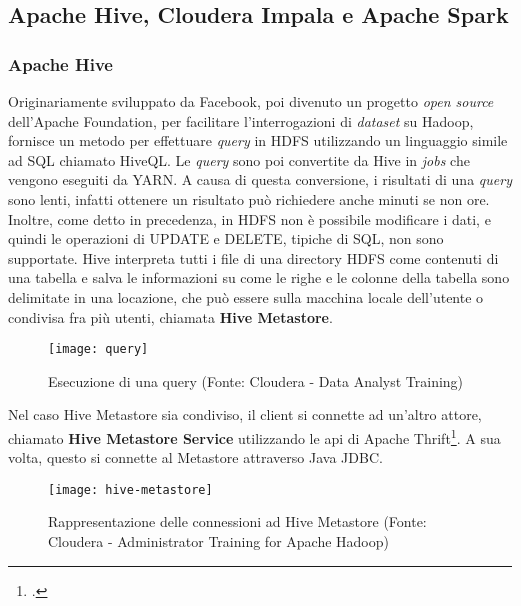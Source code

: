 \subsection{Apache Hive, Cloudera Impala e Apache Spark}
\subsubsection{Apache Hive}
Originariamente sviluppato da Facebook, poi divenuto un progetto \textit{open source} dell'Apache Foundation, per facilitare l'interrogazioni di \textit{dataset} su Hadoop, fornisce un metodo per effettuare \textit{query} in HDFS utilizzando un linguaggio simile ad SQL chiamato HiveQL. 
Le \textit{query} sono poi convertite da Hive in \textit{jobs} che vengono eseguiti da YARN. A causa di questa conversione, i risultati di una \textit{query} sono lenti, infatti ottenere un risultato può richiedere anche minuti se non ore. Inoltre, come detto in precedenza, in HDFS non è possibile modificare i dati, e quindi le operazioni di UPDATE e DELETE, tipiche di SQL, non sono supportate.
Hive interpreta tutti i file di una directory HDFS come contenuti di una tabella e salva le informazioni su come le righe e le colonne della tabella sono delimitate in una locazione, che può essere sulla macchina locale dell'utente o condivisa fra più utenti, chiamata \textbf{Hive Metastore}.
\begin{figure}[!h]
	\centering
	\texttt{[image: query]}
	\caption{Esecuzione di una query (Fonte: Cloudera - Data Analyst Training)}
\end{figure}
Nel caso Hive Metastore sia condiviso, il client si connette ad un'altro attore, chiamato \textbf{Hive Metastore Service} utilizzando le \gls{api} di Apache Thrift\footcite{https://thrift.apache.org/}. A sua volta, questo si connette al Metastore attraverso \gls{Java JDBC}.
\begin{figure}[!h]
	\centering
	\texttt{[image: hive-metastore]}
	\caption{Rappresentazione delle connessioni ad Hive Metastore (Fonte: Cloudera - Administrator Training for Apache Hadoop)}
\end{figure}


